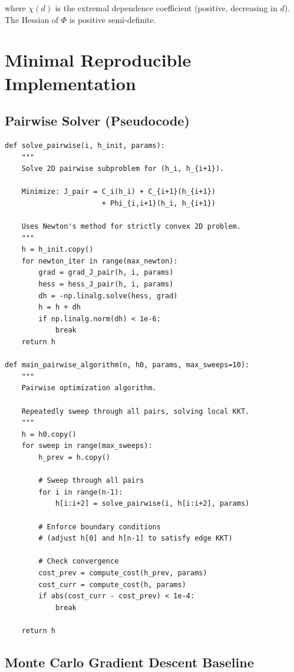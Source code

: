 \documentclass[12pt]{article}
\theoremstyle{definition}
\begin{document}
where $\chi(d)$ is the extremal dependence coefficient (positive, decreasing in $d$). The Hessian of $\Phi$ is positive semi-definite.

\section{Minimal Reproducible Implementation}

\subsection{Pairwise Solver (Pseudocode)}

\begin{verbatim}
def solve_pairwise(i, h_init, params):
    """
    Solve 2D pairwise subproblem for (h_i, h_{i+1}).

    Minimize: J_pair = C_i(h_i) + C_{i+1}(h_{i+1})
                       + Phi_{i,i+1}(h_i, h_{i+1})

    Uses Newton's method for strictly convex 2D problem.
    """
    h = h_init.copy()
    for newton_iter in range(max_newton):
        grad = grad_J_pair(h, i, params)
        hess = hess_J_pair(h, i, params)
        dh = -np.linalg.solve(hess, grad)
        h = h + dh
        if np.linalg.norm(dh) < 1e-6:
            break
    return h

def main_pairwise_algorithm(n, h0, params, max_sweeps=10):
    """
    Pairwise optimization algorithm.

    Repeatedly sweep through all pairs, solving local KKT.
    """
    h = h0.copy()
    for sweep in range(max_sweeps):
        h_prev = h.copy()

        # Sweep through all pairs
        for i in range(n-1):
            h[i:i+2] = solve_pairwise(i, h[i:i+2], params)

        # Enforce boundary conditions
        # (adjust h[0] and h[n-1] to satisfy edge KKT)

        # Check convergence
        cost_prev = compute_cost(h_prev, params)
        cost_curr = compute_cost(h, params)
        if abs(cost_curr - cost_prev) < 1e-4:
            break

    return h
\end{verbatim}

\subsection{Monte Carlo Gradient Descent Baseline}
\end{document}
